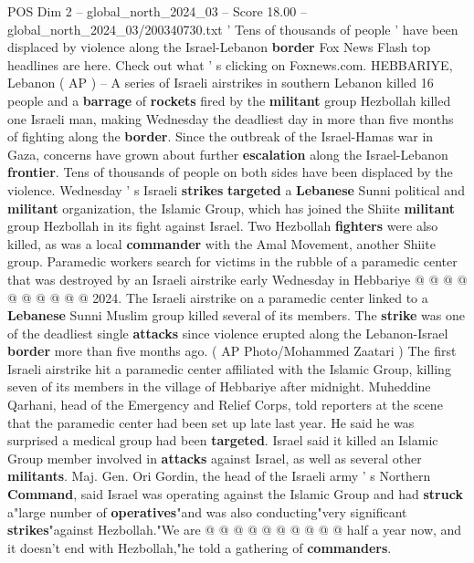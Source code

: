 \begin{textsample}{POS Dim 2 – global\_north\_2024\_03 – Score 18.00 – global\_north\_2024\_03/200340730.txt}  \label{ex:f2_pos_365}
' Tens of thousands of people ' have been displaced by violence along the Israel-Lebanon \textbf{border} Fox News Flash top headlines are here.
Check out what ' s clicking on Foxnews.com.
HEBBARIYE, Lebanon ( AP ) -- A series of Israeli airstrikes in southern Lebanon killed 16 people and a \textbf{barrage} of \textbf{rockets} fired by the \textbf{militant} group Hezbollah killed one Israeli man, making Wednesday the deadliest day in more than five months of fighting along the \textbf{border}.
Since the outbreak of the Israel-Hamas war in Gaza, concerns have grown about further \textbf{escalation} along the Israel-Lebanon \textbf{frontier}.
Tens of thousands of people on both sides have been displaced by the violence.
Wednesday ' s Israeli \textbf{strikes} \textbf{targeted} a \textbf{Lebanese} Sunni political and \textbf{militant} organization, the Islamic Group, which has joined the Shiite \textbf{militant} group Hezbollah in its fight against Israel.
Two Hezbollah \textbf{fighters} were also killed, as was a local \textbf{commander} with the Amal Movement, another Shiite group.
Paramedic workers search for victims in the rubble of a paramedic center that was destroyed by an Israeli airstrike early Wednesday in Hebbariye @ @ @ @ @ @ @ @ @ @ 2024.
The Israeli airstrike on a paramedic center linked to a \textbf{Lebanese} Sunni Muslim group killed several of its members.
The \textbf{strike} was one of the deadliest single \textbf{attacks} since violence erupted along the Lebanon-Israel \textbf{border} more than five months ago. ( AP Photo/Mohammed Zaatari ) The first Israeli airstrike hit a paramedic center affiliated with the Islamic Group, killing seven of its members in the village of Hebbariye after midnight.
Muheddine Qarhani, head of the Emergency and Relief Corps, told reporters at the scene that the paramedic center had been set up late last year.
He said he was surprised a medical group had been \textbf{targeted}.
Israel said it killed an Islamic Group member involved in \textbf{attacks} against Israel, as well as several other \textbf{militants}.
Maj.
Gen.
Ori Gordin, the head of the Israeli army ' s Northern \textbf{Command}, said Israel was operating against the Islamic Group and had \textbf{struck} a"large number of \textbf{operatives}"and was also conducting"very significant \textbf{strikes}"against Hezbollah."We are @ @ @ @ @ @ @ @ @ @ half a year now, and it doesn't end with Hezbollah,"he told a gathering of \textbf{commanders}.

\end{textsample}
